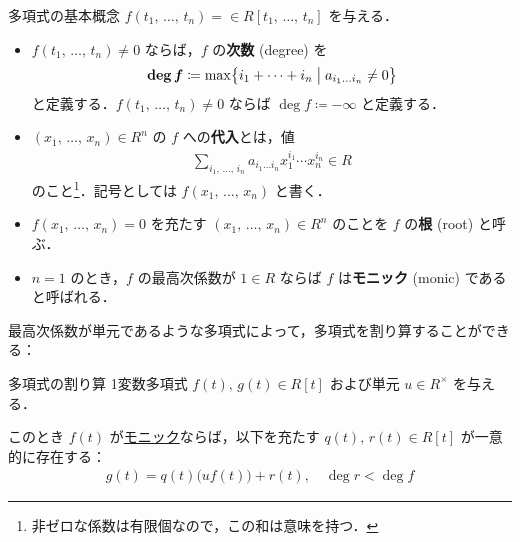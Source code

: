 \documentclass[rep_main]{subfiles}
\begin{document}
\begin{mydef}[label=def:poly-basic]{多項式の基本概念}
    $f(t_1,\, \dots,\, t_n) =  \in R[t_1,\, \dots,\, t_n]$ を与える．
    \begin{itemize}
        \item $f(t_1,\, \dots,\, t_n) \neq 0$ ならば，$f$ の\textbf{次数} (degree) を
        \begin{align}
            \bm{\deg f} \coloneqq \max \bigl\{ i_1 + \cdots + i_n \bigm| a_{i_1 \dots i_n} \neq 0 \bigr\} 
        \end{align}
        と定義する．$f(t_1,\, \dots,\, t_n) \neq 0$ ならば $\deg f \coloneqq -\infty$ と定義する．
        \item $(x_1,\, \dots,\, x_n) \in R^n$ の $f$ への\textbf{代入}とは，値
        \begin{align}
            \sum_{i_1,\, \dots,\, i_n} a_{i_1\dots i_n} x_1^{i_1} \cdots x_n^{i_n} \in R
        \end{align}
        のこと\footnote{非ゼロな係数は有限個なので，この和は意味を持つ．}．記号としては $f(x_1,\, \dots,\, x_n)$ と書く．
        \item $f(x_1,\, \dots,\, x_n) = 0$ を充たす $(x_1,\, \dots,\, x_n) \in R^n$ のことを $f$ の\textbf{根} (root) と呼ぶ．
        \item $n=1$ のとき，$f$ の最高次係数が $1 \in R$ ならば $f$ は\textbf{モニック} (monic) であると呼ばれる．
    \end{itemize}
\end{mydef}

最高次係数が単元であるような多項式によって，多項式を割り算することができる：

\begin{myprop}[label=prop:poly-divide,breakable]{多項式の割り算}
    1変数多項式 $f(t),\, g(t) \in R[t]$ および単元 $u \in R^\times$ を与える．

    このとき $f(t)$ が\hyperref[def:poly-basic]{モニック}ならば，以下を充たす $q(t),\, r(t) \in R[t]$ が一意的に存在する：
    \begin{align}
        g(t) = q(t) \bigl( uf(t) \bigr) + r(t),\quad \deg r < \deg f
    \end{align}
    
\end{myprop}
\end{document}
